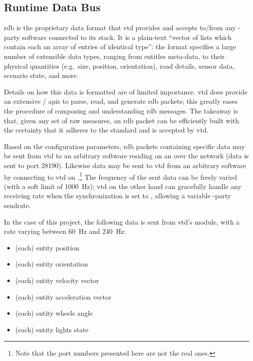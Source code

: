 \subsection{Runtime Data Bus}

\gls{rdb} is the proprietary data format that \gls{vtd} provides and accepts to/from any -party software connected to its stack. It is a plain-text \enquote{vector of lists which contain each an array of entries of identical type}{\cite{software:rdbfaqs}}: the format specifies a large number of extensible data types, ranging from entitles meta-data, to their physical quantities (e.g.\ size, position, orientation), road details, sensor data, scenario state, and more.

Details on how this data is formatted are of limited importance. \gls{vtd} does provide an extensive / \glspl{api} to parse, read, and generate \gls{rdb} \glspl{packet}; this greatly eases the procedure of composing and understanding \gls{rdb} messages. The takeaway is that, given any set of raw measures, an \gls{rdb} \gls{packet} can be efficiently built with the certainty that it adheres to the standard and is accepted by \gls{vtd}.

Based on the configuration parameters, \gls{rdb} \glspl{packet} containing specific data may be sent from \gls{vtd} to an arbitrary software residing on an  over the network (data is sent to port \num{28190}). Likewise data may be sent to \gls{vtd} from an arbitrary software by connecting to \gls{vtd} on .\footnote{Note that the port numbers presented here are not the real ones.} The frequency of the sent data can be freely varied (with a soft limit of \SI{1000}{\hertz}); \gls{vtd} on the other hand can gracefully handle any receiving rate when the synchronization is set to , allowing a variable -party \gls{sendrate}. %



In the case of this project, the following data is sent from \gls{vtd}'s  module, with a rate varying between \SI{60}{\hertz} and \SI{240}{\hertz}:

\begin{itemize}
	\item (each) entity position
	\item (each) entity orientation
	\item (each) entity velocity vector
	\item (each) entity acceleration vector
	\item (each) entity wheels angle
	\item (each) entity lights state
\end{itemize}

